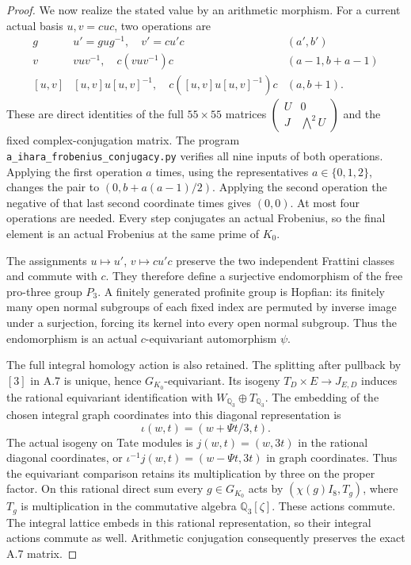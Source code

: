 \begin{proof}
We now realize the stated value by an arithmetic morphism.
For a current actual basis $u,v=cuc$, two operations are
\[
\begin{array}{c|c|c}
 g&u'=gug^{-1},\quad v'=cu'c&(a',b')\\ \hline
 v&vuv^{-1},\quad c(vuv^{-1})c&(a-1,b+a-1)\\
 {[u,v]}&[u,v]u[u,v]^{-1},\quad c([u,v]u[u,v]^{-1})c&(a,b+1).
\end{array}
 \tag{A.38.14}
\]
These are direct identities of the full $55\times55$ matrices
$\left(\begin{smallmatrix}U&0\\J&\bigwedge^2U\end{smallmatrix}\right)$
and the fixed complex-conjugation matrix. The program
\texttt{a\_ihara\_frobenius\_conjugacy.py} verifies all nine
inputs of both operations. Applying the first operation $a$
times, using the representatives $a\in\{0,1,2\}$, changes the
pair to $(0,b+a(a-1)/2)$. Applying the second operation the
negative of that last second coordinate times gives $(0,0)$.
At most four operations are needed. Every step conjugates an
actual Frobenius, so the final element is an actual Frobenius
at the same prime of $K_0$.

The assignments $u\mapsto u'$, $v\mapsto cu'c$ preserve the
two independent Frattini classes and commute with $c$. They
therefore define a surjective endomorphism of the free pro-three
group $P_3$. A finitely generated profinite group is Hopfian:
its finitely many open normal subgroups of each fixed index are
permuted by inverse image under a surjection, forcing its kernel
into every open normal subgroup. Thus the endomorphism is an
actual $c$-equivariant automorphism $\psi$.

The full integral homology action is also retained. The
splitting after pullback by $[3]$ in A.7 is unique, hence
$G_{K_0}$-equivariant. Its isogeny
$T_D\times E\to J_{E,D}$ induces the rational equivariant
identification with $W_{\mathbb Q_3}\oplus T_{\mathbb Q_3}$.
The embedding of the chosen integral graph coordinates into
this diagonal representation is
\[
 \iota(w,t)=(w+\Psi t/3,t).
 \tag{A.38.15}
\]
The actual isogeny on Tate modules is $j(w,t)=(w,3t)$ in
the rational diagonal coordinates, or
$\iota^{-1}j(w,t)=(w-\Psi t,3t)$ in graph coordinates.
Thus the equivariant comparison retains its multiplication
by three on the proper factor.
On this rational direct sum every $g\in G_{K_0}$ acts by
$(\chi(g)I_8,T_g)$, where $T_g$ is multiplication in the
commutative algebra $\mathbb Q_3[\zeta]$. These actions commute.
The integral lattice embeds in this rational representation,
so their integral actions commute as well. Arithmetic
conjugation consequently preserves the exact A.7 matrix.


\end{proof}
